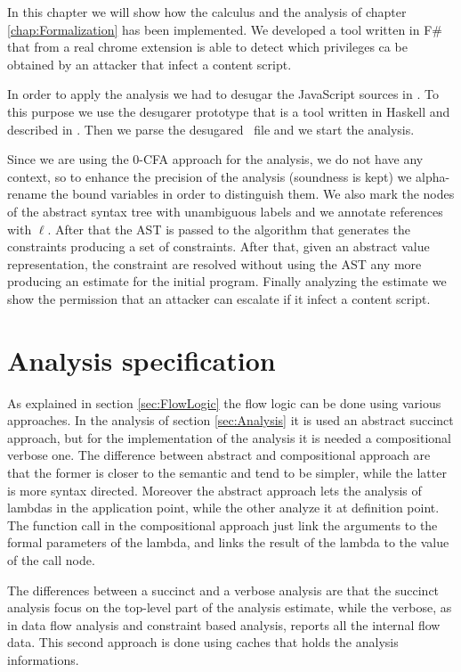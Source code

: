 In this chapter we will show how the calculus and the analysis of chapter \ref{chap:Formalization} has been implemented. We developed a tool written in F\# that from a real chrome extension is able to detect which privileges ca be obtained by an attacker that infect a content script.

In order to apply the analysis we had to desugar the JavaScript sources in \ljs. To this purpose we use the desugarer prototype that is a tool written in Haskell and described in \cite{LambdaJS}. Then we parse the desugared \ljs\ file and we start the analysis.

Since we are using the 0-CFA approach for the analysis, we do not have any context, so to enhance the precision of the analysis (soundness is kept) we alpha-rename the bound variables in order to distinguish them. We also mark the nodes of the abstract syntax tree with unambiguous labels and we annotate references with $\ell$. After that the AST is passed to the algorithm that generates the constraints producing a set of constraints. After that, given an abstract value representation, the constraint are resolved without using the AST any more producing an estimate for the initial program.
Finally analyzing the estimate we show the permission that an attacker can escalate if it infect a content script.


\section{Analysis specification}
\label{sec:AnalysisSpec}
As explained in section \ref{sec:FlowLogic} the flow logic can be done using various approaches. In the analysis of section \ref{sec:Analysis} it is used an abstract succinct approach, but for the implementation of the analysis it is needed a compositional verbose one. The difference between abstract and compositional approach are that the former is closer to the semantic and tend to be simpler, while the latter is more syntax directed. Moreover the abstract approach lets the analysis of lambdas in the application point, while the other analyze it at definition point. The function call in the compositional approach just link the arguments to the formal parameters of the lambda, and links the result of the lambda to the value of the call node.

The differences between a succinct and a verbose analysis are that the succinct analysis focus on the top-level part of the analysis estimate, while the verbose, as in data flow analysis and constraint based analysis, reports all the internal flow data. This second approach is done using caches that holds the analysis informations.

